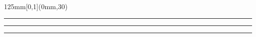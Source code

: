 \begingroup

\textblockorigin{0mm}{0mm}
\setlength{\parindent}{0mm}
\setlength{\banderougewidth}{2\TPHorizModule}
\setlength{\bandeorwidth}{\TPHorizModule}
\setlength{\gapwidth}{0.75pt}
\addtolength{\bandeorwidth}{-\gapwidth}

\begin{frame}[plain]
  \begin{textblock*}{125mm}[0,1](0mm,30\TPVertModule)
    \textcolor{or}{\rule{\bandeorwidth}{\TPVertModule}}%
    \rule{\gapwidth}{0pt}%
    \textcolor{rouge}{\rule{\banderougewidth}{\TPVertModule}} %
  \end{textblock*}
\end{frame}
\endgroup

